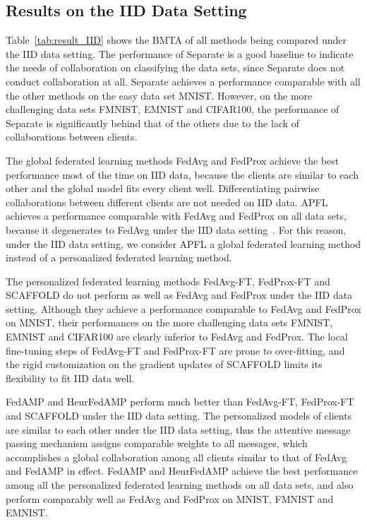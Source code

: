 \subsection{Results on the IID Data Setting}\label{subsec:expres-1}
Table~\ref{tab:result_IID} shows the BMTA of all methods being compared under the IID data setting.
The performance of Separate is a good baseline to indicate the needs of collaboration on classifying the data sets, since Separate does not conduct collaboration at all.
Separate achieves a performance comparable with all the other methods on the easy data set MNIST. However, on the more challenging data sets FMNIST, EMNIST and CIFAR100, the performance of Separate is significantly behind that of the others due to the lack of collaborations between clients.

The global federated learning methods FedAvg and FedProx achieve the best performance most of the time on IID data, because the clients are similar to each other and the global model fits every client well. Differentiating pairwise collaborations between different clients are not needed on IID data.
APFL achieves a performance comparable with FedAvg and FedProx on all data sets, because it degenerates to FedAvg under the IID data setting~\cite{deng2020adaptive}. For this reason, under the IID data setting, we consider APFL a global federated learning method instead of a personalized federated learning method.


The personalized federated learning methods FedAvg-FT, FedProx-FT and SCAFFOLD do not perform as well as FedAvg and FedProx under the IID data setting.
Although they achieve a performance comparable to FedAvg and FedProx on MNIST, their performances on the more challenging data sets FMNIST, EMNIST and CIFAR100 are clearly inferior to FedAvg and FedProx.  The local fine-tuning steps of FedAvg-FT and FedProx-FT are prone to over-fitting, and the rigid customization on the gradient updates of SCAFFOLD limits its flexibility to fit IID data well.

FedAMP and HeurFedAMP perform much better than FedAvg-FT, FedProx-FT and SCAFFOLD under the IID data setting. The personalized models of clients are similar to each other under the IID data setting, thus the attentive message passing mechanism assigns comparable weights to all messages, which accomplishes a global collaboration among all clients similar to that of FedAvg and FedAMP in effect.
FedAMP and HeurFedAMP achieve the best performance among all the personalized federated learning methods on all data sets, and also perform comparably well as FedAvg and FedProx on MNIST, FMNIST and EMNIST.



